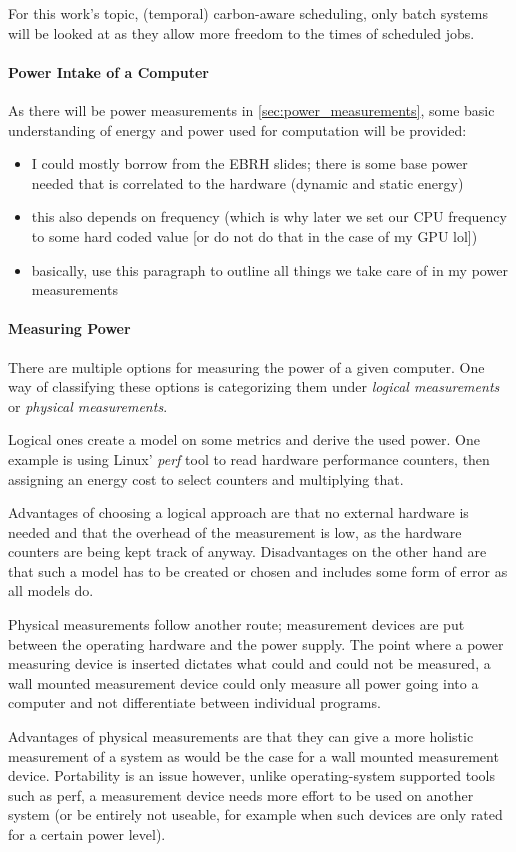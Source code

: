 For this work's topic, (temporal) carbon-aware scheduling, only batch systems will be looked at as they allow more freedom to the times of scheduled jobs.

\paragraph{Power Intake of a Computer}
As there will be power measurements in \ref{sec:power_measurements}, some basic understanding of energy and power used for computation will be provided:
\begin{itemize}
    \item I could mostly borrow from the EBRH slides; there is some base power needed that is correlated to the hardware (dynamic and static energy)
    \item this also depends on frequency (which is why later we set our CPU frequency to some hard coded value [or do not do that in the case of my GPU lol])
    \item basically, use this paragraph to outline all things we take care of in my power measurements
\end{itemize}

\paragraph{Measuring Power}

There are multiple options for measuring the power of a given computer. One way of classifying these options is categorizing them under \emph{logical measurements} or \emph{physical measurements}.

Logical ones create a model on some metrics and derive the used power. One example is using Linux' \emph{perf} tool to read hardware performance counters, then assigning an energy cost to select counters and multiplying that. 

Advantages of choosing a logical approach are that no external hardware is needed and that the overhead of the measurement is low, as the hardware counters are being kept track of anyway. 
Disadvantages on the other hand are that such a model has to be created or chosen and includes some form of error as all models do.

Physical measurements follow another route; measurement devices are put between the operating hardware and the power supply. 
The point where a power measuring device is inserted dictates what could and could not be measured, a wall mounted measurement device could only measure all power going into a computer and not differentiate between individual programs.

Advantages of physical measurements are that they can give a more holistic measurement of a system as would be the case for a wall mounted measurement device. 
Portability is an issue however, unlike operating-system supported tools such as perf, a measurement device needs more effort to be used on another system (or be entirely not useable, for example when such devices are only rated for a certain power level).